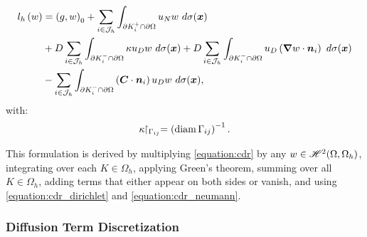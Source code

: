 \begin{align}
    l_h \left( w \right)  &= \left( g, w \right)_0 + \sum_{i \in \mathcal{J}_h} \int_{\partial K_i^+ \cap \partial \Omega} u_N w ~ d \sigma(\bm{x}) \label{equation:cdr_lh} \\
    &+ D \sum_{i \in \mathcal{J}_h} \int_{\partial K_i^- \cap \partial \Omega} \kappa u_D w ~ d \sigma(\bm{x}) + D \sum_{i \in \mathcal{J}_h} \int_{\partial K_i^- \cap \partial \Omega} u_D \left( \bm{\nabla} w \cdot \bm{n}_i \right) ~ d \sigma(\bm{x}) \notag \\
    &- \sum_{i \in \mathcal{J}_h} \int_{\partial K_i^- \cap \partial \Omega} \left( \bm{C} \cdot \bm{n}_i \right) u_D w ~ d \sigma(\bm{x}) \notag,
\end{align}
with:
\begin{align}
    \kappa \!\!\restriction_{\Gamma_{ij}} = \left( \operatorname*{diam} \Gamma_{ij} \right)^{-1}.
\end{align}

This formulation is derived by multiplying \cref{equation:cdr} by any $w \in \mathscr{H}^{2}(\Omega, \Omega_h)$, integrating over each $K \in \Omega_h$, applying Green's theorem, summing over all $K \in \Omega_h$, adding terms that either appear on both sides or vanish, and using \cref{equation:cdr_dirichlet} and \cref{equation:cdr_neumann}. %

\newpage
\subsubsection{Diffusion Term Discretization}

